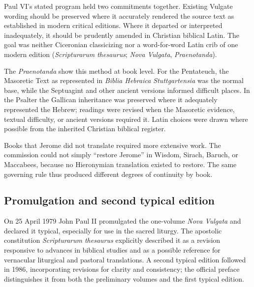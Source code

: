 Paul VI's stated program held two commitments together. Existing Vulgate wording should be preserved where it accurately rendered the source text as established in modern critical editions. Where it departed or interpreted inadequately, it should be prudently amended in Christian biblical Latin. The goal was neither Ciceronian classicizing nor a word-for-word Latin crib of one modern edition (\emph{Scripturarum thesaurus}; \emph{Nova Vulgata}, \emph{Praenotanda}).

The \emph{Praenotanda} show this method at book level. For the Pentateuch, the Masoretic Text as represented in \emph{Biblia Hebraica Stuttgartensia} was the normal base, while the Septuagint and other ancient versions informed difficult places. In the Psalter the Gallican inheritance was preserved where it adequately represented the Hebrew; readings were revised when the Masoretic evidence, textual difficulty, or ancient versions required it. Latin choices were drawn where possible from the inherited Christian biblical register.

Books that Jerome did not translate required more extensive work. The commission could not simply ``restore Jerome'' in Wisdom, Sirach, Baruch, or Maccabees, because no Hieronymian translation existed to restore. The same governing rule thus produced different degrees of continuity by book.


\subsection{Promulgation and second typical edition}

On 25 April 1979 John Paul II promulgated the one-volume \emph{Nova Vulgata} and declared it typical, especially for use in the sacred liturgy. The apostolic constitution \emph{Scripturarum thesaurus} explicitly described it as a revision responsive to advances in biblical studies and as a possible reference for vernacular liturgical and pastoral translations. A second typical edition followed in 1986, incorporating revisions for clarity and consistency; the official preface distinguishes it from both the preliminary volumes and the first typical edition.

